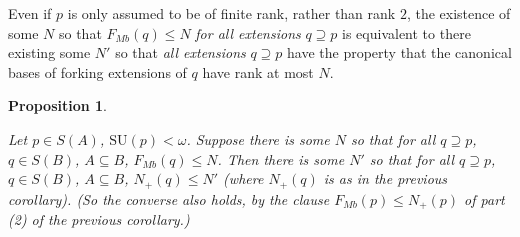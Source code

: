 \documentclass[11pt]{amsart}
\newtheorem{prop}[theorem]{Proposition}
\theoremstyle{definition}
\theoremstyle{remark}
\numberwithin{equation}{section}
\begin{document}
Even if $p$ is only assumed to be of finite rank, rather than rank $2$, the existence of some $N$ so that $F_{Mb}(q) \leq N$ \textit{for all extensions} $q \supseteq p$ is equivalent to there existing some $N'$ so that \textit{all extensions} $q \supseteq p$ have the property that the canonical bases of forking extensions of $q$ have rank at most $N$.

\begin{prop}
       \label{Mbbounds}
        
        Let $p \in S(A)$, $\mathrm{SU}(p) < \omega $. Suppose there is some $N$ so that for all $q \supseteq p$, $q \in S(B)$, $A \subseteq B $, $F_{Mb}(q) \leq N$. Then there is some $N'$ so that for all $q \supseteq p$, $q \in S(B)$, $A \subseteq B $, $N_{+}(q) \leq N'$  (where $N_{+}(q)$ is as in the previous corollary). (So the converse also holds, by the clause  $F_{Mb}(p) \leq N_{+}(p)  $ of part (2) of the previous corollary.)
\end{prop}
\end{document}
